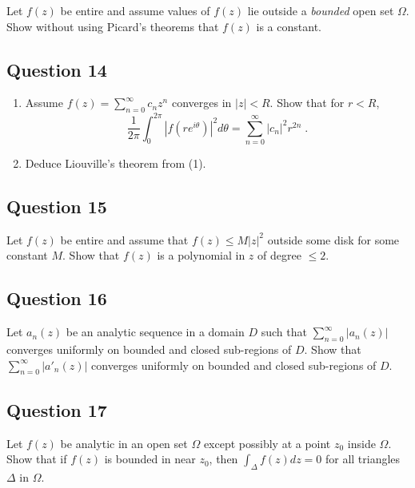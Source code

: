 \documentclass[12pt]{article}
\begin{document}
Let \(f(z)\) be entire and assume values of \(f(z)\) lie outside a
\emph{bounded} open set \(\Omega\). Show without using Picard's theorems
that \(f(z)\) is a constant.

\hypertarget{question-14-2}{%
\subsection{Question 14}\label{question-14-2}}

\begin{enumerate}
\def\labelenumi{(\arabic{enumi})}
\item
  Assume \(\displaystyle f(z) = \sum_{n=0}^\infty c_n z^n\) converges in
  \(|z| < R\). Show that for \(r <R\),
  \[\frac{1}{2 \pi} \int_0^{2 \pi} |f(r e^{i \theta})|^2 d \theta
  = \sum_{n=0}^\infty |c_n|^2 r^{2n} \; .\]
\item
  Deduce Liouville's theorem from (1).
\end{enumerate}

\hypertarget{question-15-2}{%
\subsection{Question 15}\label{question-15-2}}

Let \(f(z)\) be entire and assume that \(f(z) \leq M |z|^2\) outside
some disk for some constant \(M\). Show that \(f(z)\) is a polynomial in
\(z\) of degree \(\leq 2\).

\hypertarget{question-16-2}{%
\subsection{Question 16}\label{question-16-2}}

Let \(a_n(z)\) be an analytic sequence in a domain \(D\) such that
\(\displaystyle \sum_{n=0}^\infty |a_n(z)|\) converges uniformly on
bounded and closed sub-regions of \(D\). Show that
\(\displaystyle \sum_{n=0}^\infty |a'_n(z)|\) converges uniformly on
bounded and closed sub-regions of \(D\).

\hypertarget{question-17-2}{%
\subsection{Question 17}\label{question-17-2}}

Let \(f(z)\) be analytic in an open set \(\Omega\) except possibly at a
point \(z_0\) inside \(\Omega\). Show that if \(f(z)\) is bounded in
near \(z_0\), then \(\displaystyle \int_\Delta f(z) dz = 0\) for all
triangles \(\Delta\) in \(\Omega\).
\end{document}

